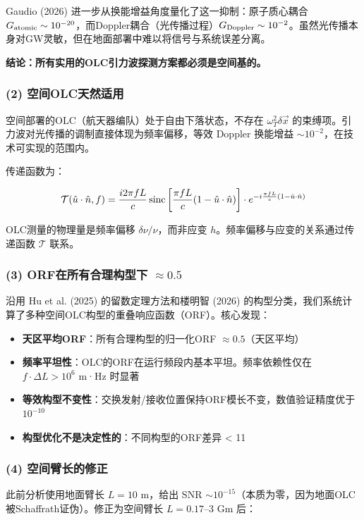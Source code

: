 \documentclass[12pt,a4paper]{article}
\begin{document}
Gaudio (2026) 进一步从换能增益角度量化了这一抑制：原子质心耦合 $G_{\rm atomic} \sim 10^{-20}$，而Doppler耦合（光传播过程）$G_{\rm Doppler} \sim 10^{-2}$。虽然光传播本身对GW灵敏，但在地面部署中难以将信号与系统误差分离。

\textbf{结论：所有实用的OLC引力波探测方案都必须是空间基的。}

\subsubsection{(2) 空间OLC天然适用}


空间部署的OLC（航天器编队）处于自由下落状态，不存在 $\omega_T^2 \delta \vec{x}$ 的束缚项。引力波对光传播的调制直接体现为频率偏移，等效 Doppler 换能增益 $\sim 10^{-2}$，在技术可实现的范围内。

传递函数为：

$$\mathcal{T}(\hat{u}\cdot\hat{n}, f) = \frac{i2\pi f L}{c}\, {\rm sinc}\left[\frac{\pi f L}{c}(1 - \hat{u}\cdot\hat{n})\right] \cdot e^{-i\frac{\pi f L}{c}(1 - \hat{u}\cdot\hat{n})}$$

OLC测量的物理量是频率偏移 $\delta\nu/\nu$，而非应变 $h$。频率偏移与应变的关系通过传递函数 $\mathcal{T}$ 联系。

\subsubsection{(3) ORF在所有合理构型下 $\approx 0.5$}


沿用 Hu et al. (2025) 的留数定理方法和楼明智 (2026) 的构型分类，我们系统计算了多种空间OLC构型的重叠响应函数（ORF）。核心发现：

\begin{itemize}
  \item \textbf{天区平均ORF}：所有合理构型的归一化ORF $\approx 0.5$（天区平均）
  \item \textbf{频率平坦性}：OLC的ORF在运行频段内基本平坦。频率依赖性仅在 $f \cdot \Delta L > 10^6$ m·Hz 时显著
  \item \textbf{等效构型不变性}：交换发射/接收位置保持ORF模长不变，数值验证精度优于 $10^{-10}$
  \item \textbf{构型优化不是决定性的}：不同构型的ORF差异 < 11%

\end{itemize}
\subsubsection{(4) 空间臂长的修正}


此前分析使用地面臂长 $L = 10$ m，给出 SNR $\sim 10^{-15}$（本质为零，因为地面OLC被Schaffrath证伪）。修正为空间臂长 $L = 0.17$–3 Gm 后：
\end{document}
